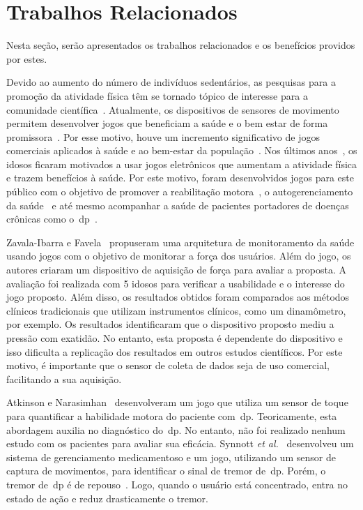 \section{Trabalhos Relacionados}\label{section:trabalhos_relacionados}
Nesta seção, serão apresentados os trabalhos relacionados e os benefícios providos por estes.

Devido ao aumento do número de indivíduos sedentários, as pesquisas para a promoção da atividade física têm se tornado tópico de interesse para a comunidade científica~\cite{bartolome11,Mandryk2014}. Atualmente, os dispositivos de sensores de movimento permitem desenvolver jogos que beneficiam a saúde e o bem estar de forma promissora~\cite{seriousgameolder2015}. Por esse motivo, houve um incremento significativo de jogos comerciais aplicados à saúde e ao bem-estar da população~\cite{wiiassesspark2016}. Nos últimos anos~\cite{physicalactivityolder2014}, os idosos ficaram motivados a usar jogos eletrônicos que aumentam a atividade física e trazem benefícios à saúde. Por este motivo, foram desenvolvidos jogos para este público com o objetivo de promover a reabilitação motora~\cite{cloudrehabi2014}, o autogerenciamento da saúde~\cite{seriousgameolder2015} e até mesmo acompanhar a saúde de pacientes portadores de doenças crônicas como o~\ac{dp}~\cite{synnott_wiipd_2012,sacbespoke2014}. 

Zavala-Ibarra e Favela~\cite{ambientgameolder2012} propuseram uma arquitetura de monitoramento da saúde usando jogos com o objetivo de monitorar a força dos usuários. Além do jogo, os autores criaram um dispositivo de aquisição de força para avaliar a proposta. A avaliação foi realizada com 5 idosos para verificar a usabilidade e o interesse do jogo proposto. Além disso, os resultados obtidos foram comparados aos métodos clínicos tradicionais que utilizam instrumentos clínicos, como um dinamômetro, por exemplo. Os resultados identificaram que o dispositivo proposto mediu a pressão com exatidão. No entanto, esta proposta é dependente do dispositivo e isso dificulta a replicação dos resultados em outros estudos científicos. Por este motivo, é importante que o sensor de coleta de dados seja de uso comercial, facilitando a sua aquisição. 

Atkinson e Narasimhan~\cite{atkinson2010} desenvolveram um jogo que utiliza um sensor de toque para quantificar a habilidade motora do paciente com~\ac{dp}. Teoricamente, esta abordagem auxilia no diagnóstico do~\ac{dp}. No entanto, não foi realizado nenhum estudo com os pacientes para avaliar sua eficácia. Synnott \textit{et al.}~\cite{synnott_wiipd_2012} desenvolveu um sistema de gerenciamento medicamentoso e um jogo, utilizando um sensor de captura de movimentos, para identificar o sinal de tremor de~\ac{dp}. Porém, o tremor de~\ac{dp} é de repouso~\cite{national2006parkinson}. Logo, quando o usuário está concentrado, entra no estado de ação e reduz drasticamente o tremor.


